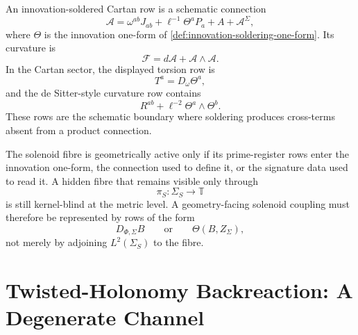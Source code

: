 \begin{definition}
\label{def:innovation-soldering-cartan-row}
An innovation-soldered Cartan row is a schematic connection
$$
\mathcal A
=
\omega^{ab}J_{ab}
+
\ell^{-1}\Theta^aP_a
+
A
+
\mathcal A^{\Sigma},
$$
where $\Theta$ is the innovation one-form of
\autoref{def:innovation-soldering-one-form}. Its curvature is
$$
\mathcal F=d\mathcal A+\mathcal A\wedge\mathcal A.
$$
In the Cartan sector, the displayed torsion row is
$$
T^a=D_{\omega}\Theta^a,
$$
and the de Sitter-style curvature row contains
$$
R^{ab}+\ell^{-2}\Theta^a\wedge\Theta^b.
$$
These rows are the schematic boundary where soldering produces
cross-terms absent from a product connection.
\end{definition}

\begin{principle}
\label{prin:innovation-soldering-solenoid-coupling-enters-innovation}
The solenoid fibre is geometrically active only if its prime-register
rows enter the innovation one-form, the connection used to define it, or
the signature data used to read it. A hidden fibre that remains visible
only through
$$
\pi_S:\Sigma_S\to\mathbb T
$$
is still kernel-blind at the metric level. A geometry-facing solenoid
coupling must therefore be represented by rows of the form
$$
D_{\Phi,\Sigma}B
\qquad
\text{or}
\qquad
\Theta(B,Z_{\Sigma}),
$$
not merely by adjoining $L^2(\Sigma_S)$ to the fibre.
\end{principle}

\section{Twisted-Holonomy Backreaction: A Degenerate Channel}
\label{sec:innovation-soldering-twisted-holonomy-backreaction-degenerate}

